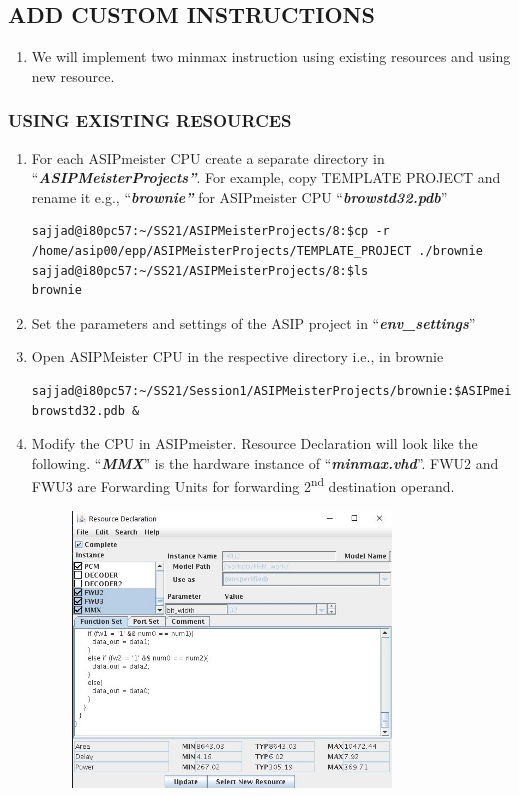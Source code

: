 \subsection{ADD CUSTOM INSTRUCTIONS}
\begin{enumerate}[resume]
\item We will implement two minmax instruction using existing resources and
using new resource.
\end{enumerate}
\subsubsection{USING EXISTING RESOURCES}
\begin{enumerate}[resume]
\item For each ASIPmeister CPU create a separate directory in ``\emph{\textbf{ASIPMeisterProjects''}}. For example, copy TEMPLATE
PROJECT and rename it e.g., ``\emph{\textbf{brownie''}} for
ASIPmeister CPU ``\emph{\textbf{browstd32.pdb}}''
\begin{lstlisting}
sajjad@i80pc57:~/SS21/ASIPMeisterProjects/8:$cp -r
/home/asip00/epp/ASIPMeisterProjects/TEMPLATE_PROJECT ./brownie
sajjad@i80pc57:~/SS21/ASIPMeisterProjects/8:$ls
brownie
\end{lstlisting}
\item
Set the parameters and settings of the ASIP project in
``\emph{\textbf{env\_settings}}''
\item
Open ASIPMeister CPU in the respective directory i.e., in brownie
\begin{lstlisting}
sajjad@i80pc57:~/SS21/Session1/ASIPMeisterProjects/brownie:$ASIPmeister
browstd32.pdb &
\end{lstlisting}
\item Modify the CPU in ASIPmeister. Resource Declaration will look like the
following. ``\emph{\textbf{MMX}}'' is the hardware instance of
``\emph{\textbf{minmax.vhd}}''. FWU2 and FWU3 are Forwarding Units for
forwarding 2\textsuperscript{nd} destination operand.
\begin{figure}[!htb]
	\centering
	\includegraphics[width=0.8\textwidth]{src/images/image1.jpg}

\end{figure}
\end{enumerate}
